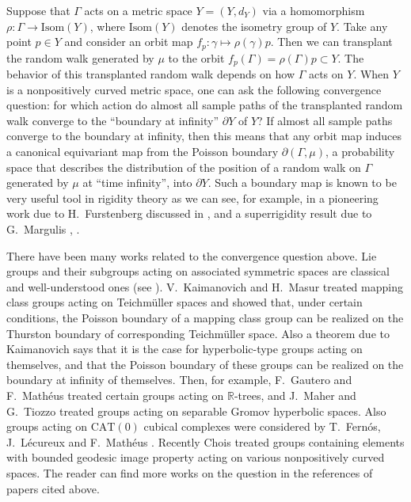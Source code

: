 \documentclass[12pt]{amsart}
\numberwithin{equation}{section}
\theoremstyle{plain}
\theoremstyle{definition}
\theoremstyle{remark}
\newcommand{\R}{{\mathbb R}}
\newcommand{\isom}[1]{\mathrm{Isom}({#1})}
\newcommand{\cat}[1]{\mathrm{CAT}(#1)}
\begin{document}
Suppose that $\Gamma$ acts on a metric space $Y=(Y,d_Y)$ via a
homomorphism $\rho\colon \Gamma \rightarrow \isom{Y}$, where $\isom{Y}$
denotes the isometry group of $Y$. 
Take any point $p\in Y$ and consider an orbit map 
$f_p\colon \gamma \mapsto \rho(\gamma)p$. 
Then we can transplant the random walk generated by $\mu$ to 
the orbit $f_p(\Gamma)=\rho(\Gamma)p\subset Y$. 
The behavior of this transplanted random walk depends on how
$\Gamma$ acts on $Y$.  When $Y$ is a nonpositively curved
metric space, one can ask the following convergence question: 
for which action do almost all sample paths of the transplanted random
walk converge to the ``boundary at infinity'' $\partial Y$ of $Y$?
If almost all sample paths converge to the boundary at infinity,
then this means that any orbit map induces a canonical equivariant map from
the Poisson boundary $\partial (\Gamma,\mu)$, a probability space that
describes the distribution of the position of a random walk on $\Gamma$
generated by $\mu$ at ``time infinity'', into $\partial Y$.  
Such a boundary map is known to be very useful tool in rigidity theory 
as we can see, for example, in a pioneering work due to H.~Furstenberg
discussed in \cite{furstenberg}, and a superrigidity result due to
G.~Margulis \cite{margulis1}, \cite{margulis2}. 

There have been many works related to the convergence question above.
Lie groups and their subgroups acting on associated symmetric spaces are
classical and well-understood ones (see \cite{benoist-quint}). 
V.~Kaimanovich and H.~Masur \cite{kaimanovich-masur} treated mapping class
groups acting on Teichm\"uller spaces and showed that, under certain
conditions, the Poisson boundary of a mapping class group can be
realized on the Thurston boundary of corresponding Teichm\"uller space. 
Also a theorem due to Kaimanovich \cite{kaimanovich} says that it is the
case for hyperbolic-type groups acting on themselves, and that the
Poisson boundary of these groups
can be realized on the boundary at infinity of themselves.
Then, for example, F.~Gautero and F.~Math\'eus \cite{gautero-matheus}
treated certain groups acting on $\R$-trees, and J.~Maher and G.~Tiozzo
\cite{maher-tiozzo} treated groups acting on separable Gromov hyperbolic
spaces. Also groups acting on $\cat{0}$ cubical complexes were
considered by T.~Fern\'os, J.~L\'ecureux and F.~Math\'eus
\cite{fernos-lecureux-matheus}. 
Recently Chois \cite{chois} treated groups containing elements with
bounded geodesic image property acting on various nonpositively curved
spaces. The reader can find more works on the question in the references
of papers cited above.
\end{document}
